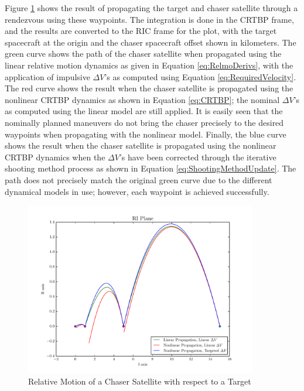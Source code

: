 \documentclass[]{article}
\begin{document}
Figure \ref{fig:RIC_1} shows the result of propagating the target and chaser satellite through a rendezvous using these waypoints.  The integration is done in the CRTBP frame, and the results are converted to the RIC frame for the plot, with the target spacecraft at the origin and the chaser spacecraft offset shown in kilometers.  The green curve shows the path of the chaser satellite when propagated using the linear relative motion dynamics as given in Equation \ref{eq:RelmoDerivs}, with the application of impulsive \(\Delta V\)'s as computed using Equation \ref{eq:RequiredVelocity}.  The red curve shows the result when the chaser satellite is propagated using the nonlinear CRTBP dynamics as shown in Equation \ref{eq:CRTBP}; the nominal \(\Delta V\)'s as computed using the linear model are still applied.  It is easily seen that the nominally planned maneuvers do not bring the chaser precisely to the desired waypoints when propagating with the nonlinear model.  Finally, the blue curve shows the result when the chaser satellite is propagated using the nonlinear CRTBP dynamics when the \(\Delta V\)'s have been corrected through the iterative shooting method process as shown in Equation \ref{eq:ShootingMethodUpdate}.  The path does not precisely match the original green curve due to the different dynamical models in use; however, each waypoint is achieved successfully.

\begin{figure}[h] \label{fig:RIC_1}
	\begin{center}
		\includegraphics[width=0.9\textwidth]{RIC_1}
		\caption{Relative Motion of a Chaser Satellite with respect to a Target}
	\end{center}
\end{figure}
\end{document}

